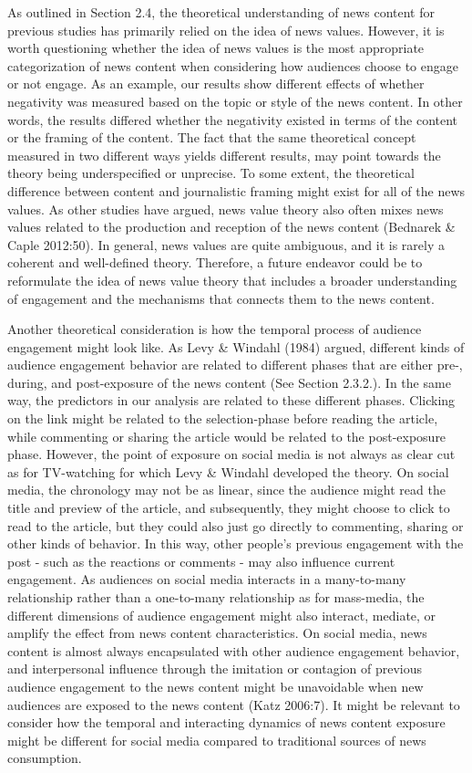 \documentclass[
]{article}
\begin{document}
As outlined in Section 2.4, the theoretical understanding of news
content for previous studies has primarily relied on the idea of news
values. However, it is worth questioning whether the idea of news values
is the most appropriate categorization of news content when considering
how audiences choose to engage or not engage. As an example, our results
show different effects of whether negativity was measured based on the
topic or style of the news content. In other words, the results differed
whether the negativity existed in terms of the content or the framing of
the content. The fact that the same theoretical concept measured in two
different ways yields different results, may point towards the theory
being underspecified or unprecise. To some extent, the theoretical
difference between content and journalistic framing might exist for all
of the news values. As other studies have argued, news value theory also
often mixes news values related to the production and reception of the
news content (Bednarek \& Caple 2012:50). In general, news values are
quite ambiguous, and it is rarely a coherent and well-defined theory.
Therefore, a future endeavor could be to reformulate the idea of news
value theory that includes a broader understanding of engagement and the
mechanisms that connects them to the news content.

\hspace{-2.5em}

\noindent Another theoretical consideration is how the temporal process
of audience engagement might look like. As Levy \& Windahl (1984)
argued, different kinds of audience engagement behavior are related to
different phases that are either pre-, during, and post-exposure of the
news content (See Section 2.3.2.). In the same way, the predictors in
our analysis are related to these different phases. Clicking on the link
might be related to the selection-phase before reading the article,
while commenting or sharing the article would be related to the
post-exposure phase. However, the point of exposure on social media is
not always as clear cut as for TV-watching for which Levy \& Windahl
developed the theory. On social media, the chronology may not be as
linear, since the audience might read the title and preview of the
article, and subsequently, they might choose to click to read to the
article, but they could also just go directly to commenting, sharing or
other kinds of behavior. In this way, other people's previous engagement
with the post - such as the reactions or comments - may also influence
current engagement. As audiences on social media interacts in a
many-to-many relationship rather than a one-to-many relationship as for
mass-media, the different dimensions of audience engagement might also
interact, mediate, or amplify the effect from news content
characteristics. On social media, news content is almost always
encapsulated with other audience engagement behavior, and interpersonal
influence through the imitation or contagion of previous audience
engagement to the news content might be unavoidable when new audiences
are exposed to the news content (Katz 2006:7). It might be relevant to
consider how the temporal and interacting dynamics of news content
exposure might be different for social media compared to traditional
sources of news consumption.
\end{document}
